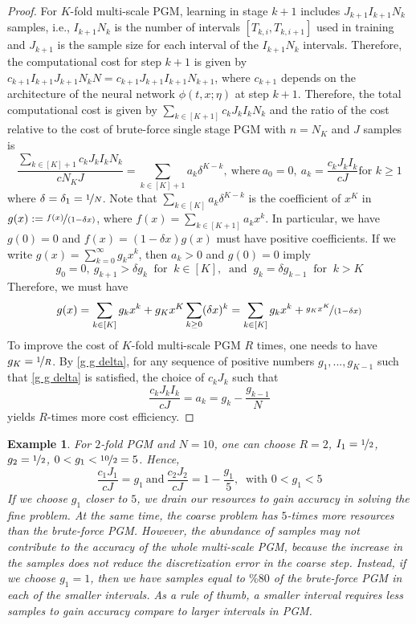 \documentclass{article}
\newtheorem{eg}{Example}[section]
\numberwithin{equation}{section}
\begin{document}
\begin{proof}
For $K$-fold multi-scale PGM, learning in stage $k+1$ includes $J_{k+1}I_{k+1}N_k$ samples, i.e., $I_{k+1}N_k$ is the number of intervals $[T_{k,i},T_{k,i+1}]$ used in training and $J_{k+1}$ is the sample size for each interval of the $I_{k+1}N_k$ intervals. Therefore, the computational cost for step $k+1$ is given by $c_{k+1}I_{k+1}J_{k+1}N_kN=c_{k+1}J_{k+1}I_{k+1}N_{k+1}$, where $c_{k+1}$ depends on the architecture of the neural network $\phi(t,x;\eta)$ at step $k+1$. Therefore, the total computational cost is given by $\sum_{k\in[K+1]}c_{k}J_{k}I_{k}N_{k}$ and the ratio of the cost relative to the cost of brute-force single stage PGM with $n=N_K$ and $J$ samples is
\begin{equation}
    \dfrac{\sum_{k\in[K]+1}c_{k}J_{k}I_{k}N_{k}}{cN_KJ}=\!\!\!\!\!\sum_{k\in[K]+1}\!\!\!a_{k}\delta^{K-k},~\text{where}~ a_0=0, ~a_{k}=\dfrac{c_{k}J_{k}I_{k}}{cJ}\text{for }k\ge1
\end{equation}
where $\delta=\delta_1=\nicefrac{1}{N}$.
Note that $\sum_{k\in[K]}a_{k}\delta^{K-k}$ is the coefficient of $x^K$ in $g(x):=\nicefrac{f(x)}{(1-\delta x)}$, where $f(x)=\sum_{k\in[K+1]}a_{k}x^{k}$.
In particular, we have $g(0)=0$ and $f(x)=(1-\delta x)g(x)$ must have positive coefficients. If we write $g(x)=\sum_{k=0}^\infty g_{k}x^{k}$, then $a_k>0$ and $g(0)=0$  imply
\begin{equation}\label{g g delta}
g_0=0,~g_{k+1}>\delta g_{k}~\text{ for }~k\in[K],~\text{ and }~g_{k}=\delta g_{k-1}~\text{ for }~k>K
\end{equation} 
Therefore, we must have $$g(x)=\sum_{k\in[K]} g_{k}x^{k} +{g_Kx^K}\sum_{k\ge0}(\delta x)^k=\sum_{k\in[K]} g_{k}x^{k}+\nicefrac{g_Kx^K}{(1-\delta x)}$$
To improve the cost of $K$-fold multi-scale PGM $R$ times, one needs to have $g_K= \nicefrac{1}{R}$. By \eqref{g g delta}, 
for any sequence of positive numbers $g_1,...,g_{K-1}$ such that \eqref{g g delta} is satisfied, the choice of $c_{k}J_{k}$ such that 
\begin{equation}
    \dfrac{c_{k}J_{k}I_{k}}{cJ}=a_{k}=g_k-\dfrac{g_{k-1}}{N}
\end{equation}
yields $R$-times more cost efficiency.
\end{proof}
\begin{eg}
    For $2$-fold PGM and $N=10$, one can choose $R=2$, $I_1=\nicefrac{1}{2}$, $g_2=\nicefrac{1}{2}$, $0<g_1<\nicefrac{10}{2}=5$. Hence,
\begin{equation}
    \dfrac{c_{1}J_{1}}{cJ}=g_1~\text{and}~\dfrac{c_{2}J_{2}}{cJ}=1-\dfrac{g_1}{5}, ~\text{ with } 0<{g_1}<5
\end{equation}
If we choose $g_1$ closer to $5$, we drain our resources to gain accuracy in solving the fine problem. At the same time, the coarse problem has $5$-times more resources than the brute-force PGM. However, the abundance of samples may not contribute to the accuracy of the whole multi-scale PGM, because the increase in the samples does not reduce the discretization error in the coarse step. Instead, if we choose $g_1=1$, then we have samples equal to $\%80$ of the brute-force PGM in each of the smaller intervals. As a rule of thumb, a smaller interval requires less samples to gain accuracy compare to larger intervals in PGM. 
\end{eg}
\end{document}
